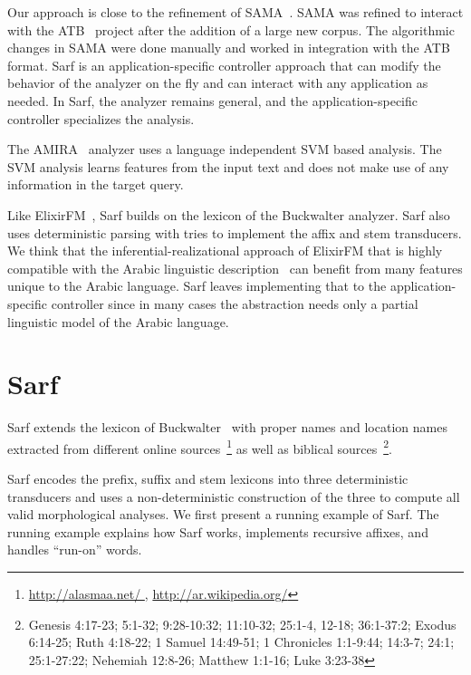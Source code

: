 \documentclass[11pt]{article}
\begin{document}

Our approach is close to the refinement of SAMA~\cite{Maamouri:10}.
SAMA was refined to interact with
the ATB~\cite{Maamouri:04} project after the addition of a large 
new corpus. 
The algorithmic changes in SAMA were
done manually and worked in integration with the ATB format. 
Sarf is an application-specific controller approach that can modify 
the behavior of the analyzer on the fly and can interact
with any application as needed. 
In Sarf, the analyzer remains general, and the 
application-specific controller specializes the analysis.

The AMIRA~\cite{Diab:07} analyzer uses 
a language independent SVM based analysis. 
The SVM analysis learns features from the input text 
and does not make use of any information 
in the target query.

Like ElixirFM~\cite{Otakar:07}, Sarf builds on the lexicon
of the Buckwalter analyzer. 
Sarf also uses deterministic parsing with tries 
to implement the affix and stem transducers. 
We think that the inferential-realizational approach 
of ElixirFM
that is highly compatible with the Arabic linguistic 
description~\cite{Badawi:04}
can benefit from many features unique to the Arabic language.
Sarf leaves implementing that to the application-specific controller
since in many cases the abstraction needs only a partial 
linguistic model of the Arabic language. 


\section{Sarf}
\label{sec:sarf}

Sarf extends the lexicon of Buckwalter~ with
proper names and location names extracted from different online 
sources~\footnote{\href{http://alasmaa.net/}{http://alasmaa.net/ }, 
\href{http://ar.wikipedia.org/}{http://ar.wikipedia.org/}}
as well as biblical sources~\footnote{Genesis 4:17-23; 5:1-32; 9:28-10:32; 11:10-32; 25:1-4, 12-18; 36:1-37:2; Exodus 6:14-25; Ruth 4:18-22; 1 Samuel 14:49-51; 1 Chronicles 1:1-9:44; 14:3-7; 24:1; 25:1-27:22; Nehemiah 12:8-26; Matthew 1:1-16; Luke 3:23-38}.

Sarf encodes the prefix, suffix and stem lexicons into
three deterministic transducers and 
uses a non-deterministic construction
of the three to compute all valid morphological analyses.
We first present a running example of Sarf.
The running example explains how Sarf works,
implements recursive affixes, and
handles ``run-on'' words.
\end{document}

